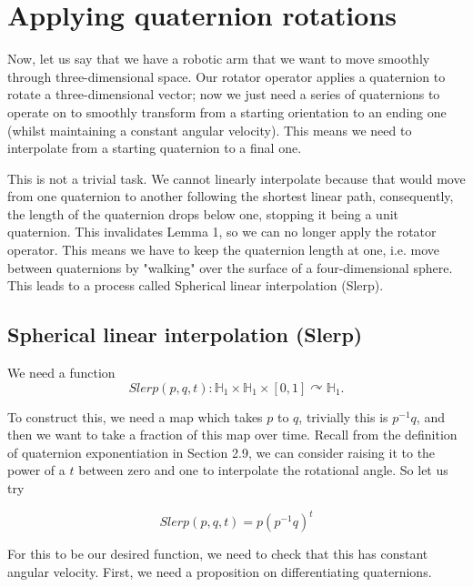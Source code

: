 \documentclass[a4paper, 11pt]{article}
\begin{document}
\section{Applying quaternion rotations}

Now, let us say that we have a robotic arm that we want to move smoothly through three-dimensional space. Our rotator operator applies a quaternion to rotate a three-dimensional vector; now we just need a series of quaternions to operate on to smoothly transform from a starting orientation to an ending one (whilst maintaining a constant angular velocity). This means we need to interpolate from a starting quaternion to a final one.

This is not a trivial task. We cannot linearly interpolate because that would move from one quaternion to another following the shortest linear path, consequently, the length of the quaternion drops below one, stopping it being a unit quaternion. This invalidates Lemma 1, so we can no longer apply the rotator operator. This means we have to keep the quaternion length at one, i.e. move between quaternions by "walking" over the surface of a four-dimensional sphere. This leads to a process called Spherical linear interpolation (Slerp). \citep[p.~248]{shoemake_1985}

\subsection{Spherical linear interpolation (Slerp)}

We need a function \[Slerp(p,q,t): \mathbb{H}_1 \times \mathbb{H}_1 \times [0,1] \curvearrowright \mathbb{H}_1.\]

To construct this, we need a map which takes $p$ to $q$, trivially this is $p^{-1}q$, and then we want to take a fraction of this map over time. Recall from the definition of quaternion exponentiation in Section 2.9, we can consider raising it to the power of a $t$ between zero and one to interpolate the rotational angle. So let us try

\[Slerp(p,q,t) =p(p^{-1}q)^t\] \citep[p.~43]{dam_koch_lillholm_1998}

For this to be our desired function, we need to check that this has constant angular velocity. First, we need a proposition on differentiating quaternions. 
\end{document}
